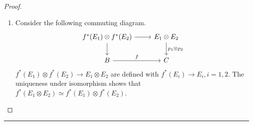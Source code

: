 \begin{proof}
\begin{enumerate}
    \item Consider the following commuting diagram.
    \begin{equation}
        \begin{tikzcd}
        f^*(E_1)\otimes f^*(E_2)\arrow[r]\arrow[d] &E_1\otimes E_2\arrow{d}{p_1\otimes p_2}\\
        B\arrow{r}{f}&C
        \end{tikzcd}
    \end{equation}
     $f^*(E_1)\otimes f^*(E_2)\rightarrow E_1\otimes E_2$ are defined with $f^*(E_i)\rightarrow E_i,i=1,2$. The uniqueness under isomorphism shows that $f^*(E_1\otimes E_2)\simeq f^*(E_1)\otimes f^*(E_2)$.
\end{enumerate}
\end{proof}
\noindent\rule{\textwidth}{1pt}
\newline